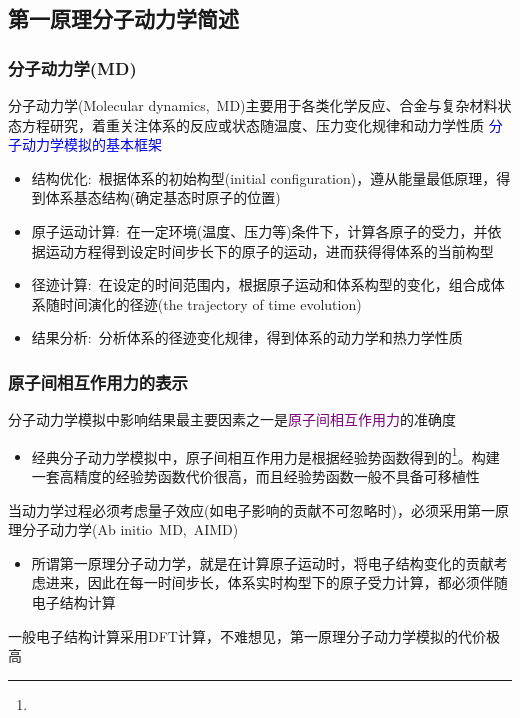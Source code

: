 \subsection{第一原理分子动力学简述}
\frame
{
	\frametitle{分子动力学\textrm{(MD)}}
	分子动力学\textrm{(Molecular dynamics,~MD)}主要用于各类化学反应、合金与复杂材料状态方程研究，着重关注体系的反应或状态随温度、压力变化规律和动力学性质
\vskip 5pt
\textcolor{blue}{分子动力学模拟的基本框架}
	\begin{itemize}
		\item 结构优化:~根据体系的初始构型\textrm{(initial configuration)}，遵从能量最低原理，得到体系基态结构(确定基态时原子的位置)
		\item 原子运动计算:~在一定环境(温度、压力等)条件下，计算各原子的受力，并依据运动方程得到设定时间步长下的原子的运动，进而获得得体系的当前构型
		\item 径迹计算:~在设定的时间范围内，根据原子运动和体系构型的变化，组合成体系随时间演化的径迹\textrm{(the trajectory of time evolution)}
		\item 结果分析:~分析体系的径迹变化规律，得到体系的动力学和热力学性质
	\end{itemize}
}

\frame
{
	\frametitle{原子间相互作用力的表示}
	分子动力学模拟中影响结果最主要因素之一是\textcolor{purple}{原子间相互作用力}的准确度
\vskip 5pt
\begin{itemize}
	\item 经典分子动力学模拟中，原子间相互作用力是根据经验势函数得到的\footnote{\fontsize{6.2pt}{4.2pt}\selectfont{经验势函数也称为力场，是参数化形式给出的原子间相互作用，一般通过对实验数据拟合或小体系的第一原理计算得到}}。构建一套高精度的经验势函数代价很高，而且经验势函数一般不具备可移植性
\end{itemize}
\vskip 5pt
	当动力学过程必须考虑量子效应(如电子影响的贡献不可忽略时)，必须采用第一原理分子动力学\textrm{(Ab initio~MD,~AIMD)}
	\begin{itemize}
		\item 所谓第一原理分子动力学，就是在计算原子运动时，将电子结构变化的贡献考虑进来，因此在每一时间步长，体系实时构型下的原子受力计算，都必须伴随电子结构计算
	\end{itemize}
	一般电子结构计算采用\textrm{DFT}计算，不难想见，第一原理分子动力学模拟的代价极高
}

